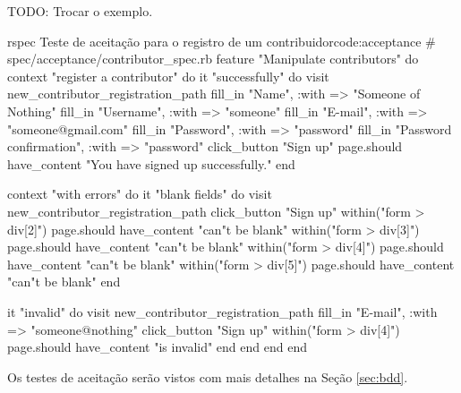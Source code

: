 TODO: Trocar o exemplo.
\begin{mycode}{rspec}%
{Teste de aceitação para o registro de um contribuidor}{code:acceptance}
# spec/acceptance/contributor_spec.rb
feature "Manipulate contributors" do
  context "register a contributor" do
    it "successfully" do
      visit new_contributor_registration_path
      fill_in "Name", :with => "Someone of Nothing"
      fill_in "Username", :with => "someone"
      fill_in "E-mail", :with => "someone@gmail.com"
      fill_in "Password", :with => "password"
      fill_in "Password confirmation", :with => "password"
      click_button "Sign up"
      page.should have_content "You have signed up successfully."
    end

    context "with errors" do
      it "blank fields" do
        visit new_contributor_registration_path
        click_button "Sign up"
        within("form > div[2]") { page.should have_content "can"t be blank"}
        within("form > div[3]") { page.should have_content "can"t be blank"}
        within("form > div[4]") { page.should have_content "can"t be blank"}
        within("form > div[5]") { page.should have_content "can"t be blank"}
      end

      it "invalid" do
        visit new_contributor_registration_path
        fill_in "E-mail", :with => "someone@nothing"
        click_button "Sign up"
        within("form > div[4]") { page.should have_content "is invalid"}
      end
    end
  end
end
\end{mycode}

Os testes de aceitação serão vistos com mais detalhes na Seção \ref{sec:bdd}.


